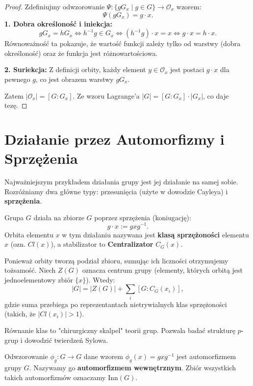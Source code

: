 \begin{proof}
Zdefiniujmy odwzorowanie $\Psi: \{gG_x \mid g \in G\} \to \mathcal{O}_x$ wzorem:
\[ \Psi(gG_x) = g \cdot x. \]
\noindent \textbf{1. Dobra określoność i iniekcja:}
\[ gG_x = hG_x \iff h^{-1}g \in G_x \iff (h^{-1}g) \cdot x = x \iff g \cdot x = h \cdot x. \]
Równoważność ta pokazuje, że wartość funkcji zależy tylko od warstwy (dobra określoność) oraz że funkcja jest różnowartościowa.

\noindent \textbf{2. Suriekcja:}
Z definicji orbity, każdy element $y \in \mathcal{O}_x$ jest postaci $g \cdot x$ dla pewnego $g$, co jest obrazem warstwy $gG_x$.

Zatem $|\mathcal{O}_x| = [G:G_x]$. Ze wzoru Lagrange'a $|G| = [G:G_x] \cdot |G_x|$, co daje tezę.
\end{proof}

\section{Działanie przez Automorfizmy i Sprzężenia}

Najważniejszym przykładem działania grupy jest jej działanie na samej sobie. Rozróżniamy dwa główne typy: przesunięcia (użyte w dowodzie Cayleya) i \textbf{sprzężenia}.

\begin{definition}
Grupa $G$ działa na zbiorze $G$ poprzez sprzężenia (koniugację):
\[ g \cdot x := gxg^{-1}. \]
Orbita elementu $x$ w tym działaniu nazywana jest \textbf{klasą sprzężoności} elementu $x$ (ozn. $Cl(x)$), a stabilizator to \textbf{Centralizator} $C_G(x)$.
\end{definition}

\begin{corollary}
Ponieważ orbity tworzą podział zbioru, sumując ich liczności otrzymujemy tożsamość. Niech $Z(G)$ oznacza centrum grupy (elementy, których orbitą jest jednoelementowy zbiór $\{x\}$). Wtedy:
\[ |G| = |Z(G)| + \sum_{i} [G : C_G(x_i)], \]
gdzie suma przebiega po reprezentantach nietrywialnych klas sprzężoności (takich, że $|Cl(x_i)| > 1$).
\end{corollary}

\begin{intuition}
Równanie klas to "chirurgiczny skalpel" teorii grup. Pozwala badać strukturę $p$-grup i dowodzić twierdzeń Sylowa.
\end{intuition}

\begin{definition}
Odwzorowanie $\phi_g: G \to G$ dane wzorem $\phi_g(x) = gxg^{-1}$ jest automorfizmem grupy $G$. Nazywamy go \textbf{automorfizmem wewnętrznym}.
Zbiór wszystkich takich automorfizmów oznaczamy $\text{Inn}(G)$.
\end{definition}

